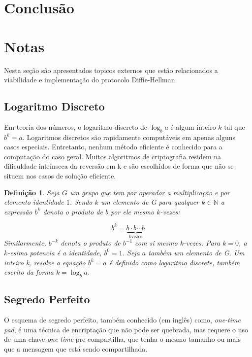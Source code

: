 \documentclass{article}
\newtheorem*{definition}{Definição}
\begin{document}
\section{Conclusão}%
\label{sec:conclusao}






\section{Notas}%
\label{sec:notas}
Nesta seção são apresentados topicos externos que estão relacionados a
viabilidade e implementação do protocolo Diffie-Hellman.

\subsection{Logaritmo Discreto}%
\label{sub:logaritmo_discreto}
Em teoria dos números, o logaritmo discreto de $\log_{b}{a}$ é algum inteiro
$k$ tal que $b^k=a$. Logaritmos discretos são rapidamente computáveis em apenas
alguns casos especiais. Entretanto, nenhum método eficiente é conhecido para
a computação do caso geral. Muitos algoritmos de criptografia residem na
dificuldade intrínseca da reversão em k e são escolhidos de forma que não se
situem nos casos de solução eficiente.

\begin{definition}
    Seja $G$ um grupo que tem por operador a multiplicação e por elemento
    identidade $1$. Sendo $k$ um elemento de G para qualquer
    $k \in \mathbb{N}$ a expressão $b^k$ denota o produto de $b$ por ele mesmo
    $k$-vezes:

    \[
    b^{k}=\underbrace{b\cdot b\cdots b}_{k\text{vezes}}
    \]
    Similarmente, $b^{-k}$ denota o produto de $b^{-1}$ com si mesmo $k$-vezes.
    Para $k=0$, a $k$-esima potencia é a identidade, $b^0=1$. Seja $a$ também
    um elemento de G. Um inteiro k, resolve a equação $b^k=a$ é definido como
    logaritmo discrete, também escrito da forma $k=\log_b{a}$.
\end{definition}


\subsection{Segredo Perfeito}%
\label{sub:segredo_perfeito}
O esquema de segredo perfeito, também conhecido (em inglês) como, \textit{
one-time pad}, é uma técnica de encriptação que não pode ser quebrada, mas
requere o uso de uma chave \textit{one-time} pre-compartilha, que tenha o mesmo
tamanho ou mais que a mensagem que está sendo compartilhada.
\end{document}
